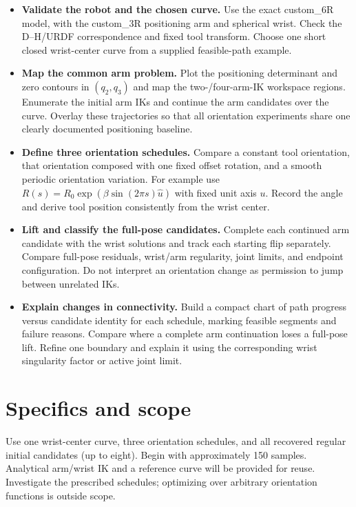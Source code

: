 \documentclass[11pt,a4paper]{article}
\begin{document}
\begin{itemize}
  \item \textbf{Validate the robot and the chosen curve.} Use the exact
custom\_6R model, with the custom\_3R positioning arm and spherical wrist.
Check the D--H/URDF correspondence and fixed tool transform. Choose one
short closed wrist-center curve from a supplied feasible-path example.

  \item \textbf{Map the common arm problem.} Plot the positioning determinant and
zero contours in $(q_2,q_3)$ and map the two-/four-arm-IK workspace regions.
Enumerate the initial arm IKs and continue the arm candidates over the
curve. Overlay these trajectories so that all orientation experiments share
one clearly documented positioning baseline.

  \item \textbf{Define three orientation schedules.} Compare a constant tool
orientation, that orientation composed with one fixed offset rotation, and
a smooth periodic orientation variation. For example use
$R(s)=R_0\exp(\beta\sin(2\pi s)\widehat{u})$ with fixed unit axis $u$.
Record the angle and derive tool position consistently from the wrist center.

  \item \textbf{Lift and classify the full-pose candidates.} Complete each
continued arm candidate with the wrist solutions and track each starting
flip separately. Compare full-pose residuals, wrist/arm regularity, joint
limits, and endpoint configuration. Do not interpret an orientation change
as permission to jump between unrelated IKs.

  \item \textbf{Explain changes in connectivity.} Build a compact chart of path
progress versus candidate identity for each schedule, marking feasible
segments and failure reasons. Compare where a complete arm continuation
loses a full-pose lift. Refine one boundary and explain it using the
corresponding wrist singularity factor or active joint limit.
\end{itemize}

\newpage
\section*{Specifics and scope}
Use one wrist-center curve, three orientation schedules, and all
recovered regular initial candidates (up to eight). Begin with approximately
150 samples. Analytical arm/wrist IK and a reference curve will be provided for
reuse. Investigate the prescribed schedules; optimizing over arbitrary
orientation functions is outside scope.
\end{document}
